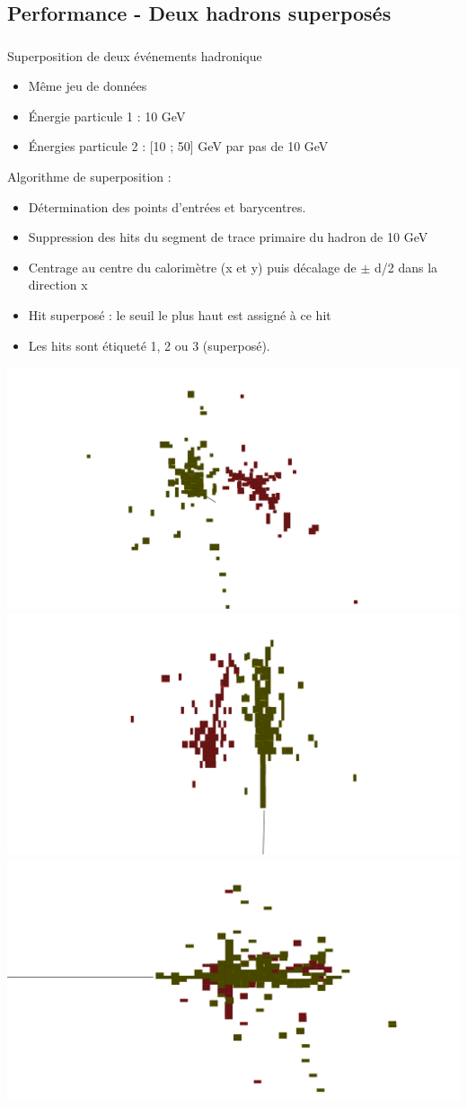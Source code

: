 \documentclass[8pt]{beamer}
\begin{document}
  \subsection{Performance - Deux hadrons superposés}
  \begin{frame}
  \frametitle{\secname}
  \framesubtitle{\subsecname}
    \begin{block}{Superposition de deux événements hadronique}
      \begin{itemize}
        \item Même jeu de données
        \item Énergie particule 1 : 10 GeV
        \item Énergies particule 2 : [10 ; 50] GeV par pas de 10 GeV
      \end{itemize}
      Algorithme de superposition :
      \begin{itemize}
        \item Détermination des points d'entrées et barycentres.
        \item Suppression des hits du segment de trace primaire du hadron de 10 GeV
        \item Centrage au centre du calorimètre (x et y) puis décalage de $\pm$ d/2 dans la direction x
        \item Hit superposé : le seuil le plus haut est assigné à ce hit 
        \item Les hits sont étiqueté 1, 2 ou 3 (superposé).
      \end{itemize}
    \end{block}
    \includegraphics[width=0.32\linewidth]{ArborPFA_PandoraMonitoring_SDHCAL_Overlay_XY.pdf}
    \includegraphics[width=0.32\linewidth]{ArborPFA_PandoraMonitoring_SDHCAL_Overlay_XZ.pdf}
    \includegraphics[width=0.32\linewidth]{ArborPFA_PandoraMonitoring_SDHCAL_Overlay_YZ.pdf}
  \end{frame}
  
\end{document}
